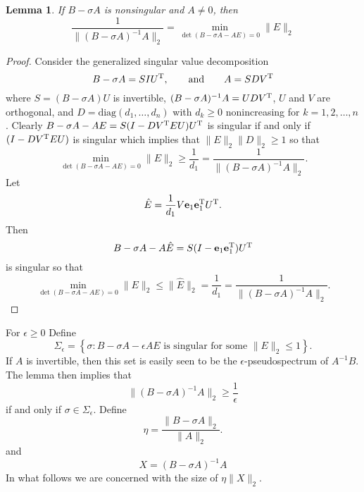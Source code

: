 \documentclass[12pt]{article}
\def\eqand{\qquad\mbox{and}\qquad}
\def\vec#1{{\bf #1}}
\def\T{{\rm T}}
\def\diag{\mbox{diag}}
\newtheorem{lemma}{Lemma}
\begin{document}
\begin{lemma}
  If $B-\sigma A$ is nonsingular and $A\neq 0$, then
  \begin{equation*}
    \frac{1}{\|(B-\sigma A)^{-1} A\|_2}
     =
    \min_{\det(B -\sigma A - AE )=0} \|E\|_2
  \end{equation*}
\end{lemma}
\begin{proof}
  Consider the generalized singular value decomposition
  \begin{equation*}
    B - \sigma A = S I U^\T,\eqand
    A = S D V^\T
  \end{equation*}
  where $S=(B-\sigma A)U$ is invertible,
  $(B-\sigma A)^{-1}A = U D V^\T$, $U$ and $V$ are orthogonal, and
  $D = \diag(d_1, \ldots, d_n)$ with $d_k\geq 0$ nonincreasing for
  $k=1,2,\ldots, n$.  Clearly
  $B-\sigma A - AE = S (I - D V^\T E U) U^\T$ is singular if and only
  if $(I - D V^\T E U)$ is singular which implies that
  $\|E\|_2 \|D\|_2 \geq 1$ so that
  \begin{equation*}
    \min_{\det(B -\sigma A - AE )=0} \|E\|_2 \geq \frac{1}{d_1} = \frac{1}{\|(B-\sigma A)^{-1}A\|_2}.
  \end{equation*}
  Let  
  \begin{equation*}
    \hat{E} = \frac{1}{d_1}V \vec{e}_1 \vec{e}_1^\T U^\T.
  \end{equation*}
  Then
  \begin{equation*}
    B-\sigma A - A \hat{E} = S (I-\vec{e}_1 \vec{e}_1^\T) U^\T
  \end{equation*}
  is singular so that
  \begin{equation*}
    \min_{\det(B -\sigma A - AE )=0} \|E\|_2 \leq \|\hat{E}\|_2 = \frac{1}{d_1} = \frac{1}{\|(B-\sigma A)^{-1} A\|_2}.
  \end{equation*}
\end{proof}

For $\epsilon \geq 0$ Define
\begin{equation}
  \Sigma_\epsilon =
  \left\{ \sigma : \mbox{$B-\sigma A - \epsilon A E$ is singular for some $\|E\|_2\leq 1$}
  \right\}.
\end{equation}
If $A$ is invertible, then this set is easily seen to be the
$\epsilon$-pseudospectrum of $A^{-1}B$.  The lemma then implies that
\begin{equation*}
  \|(B-\sigma A)^{-1} A\|_2 \geq \frac{1}{\epsilon}
\end{equation*}
if and only if $\sigma \in \Sigma_\epsilon$.  Define
\begin{equation}
  \eta = \frac{\|B-\sigma A\|_2}{\|A\|_2}.
\end{equation}
and
\begin{equation}
  X = (B-\sigma A)^{-1} A
\end{equation}
In what follows we are concerned with the size of $\eta \|X\|_2$.






\end{document}
